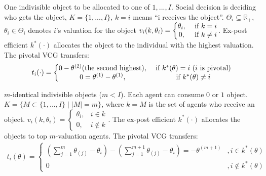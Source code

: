 \documentclass[11pt]{elegantbook_2}
\begin{document}
\begin{example}
    One indivisible object to be allocated to one of $1,...,I$. Social decision is deciding who gets the object, $K=\{1,...,I\}$, $k=i$ means ``i receives the object''. $\Theta_i\subseteq \mathbb{R}_+$, $\theta_i\in\Theta_i$ denotes $i$'s valuation for the object $v_i(k,\theta_i)=\left\{\begin{matrix}
        \theta_i,& \textnormal{ if }k=i\\
        0,& \textnormal{ if }k\neq i
    \end{matrix}\right.$.
    Ex-post efficient $k^*(\cdot)$ allocates the object to the individual with the highest valuation. The pivotal VCG transfers:
    \begin{equation}
        \begin{aligned}
            t_i(\cdot)=\left\{\begin{matrix}
                0-\theta^{(2)}\textnormal{(the second highest)},& \textnormal{ if }k^*(\theta)=i \textnormal{ ($i$ is pivotal)}\\
                0=\theta^{(1)}-\theta^{(1)},&\textnormal{ if }k^*(\theta)\neq i
            \end{matrix}\right.
        \end{aligned}
        \nonumber
    \end{equation}
\end{example}


\begin{example}
    $m$-identical indivisible objects ($m<I$). Each agent can consume $0$ or $1$ object. $K=\{M\subset \{1,...,I\}\mid |M|=m\}$, where $k=M$ is the set of agents who receive an object. $v_i(k,\theta_i)=\left\{\begin{matrix}
        \theta_i,&i\in k\\
        0,&i\notin k
    \end{matrix}\right.$. The ex-post efficient $k^*(\cdot)$ allocates the objects to top $m$-valuation agents. The pivotal VCG transfers:
    \begin{equation}
        \begin{aligned}
            t_i(\theta)=\left\{\begin{matrix}
                \left(\sum_{j=1}^m\theta_{(j)}-\theta_i\right)-\left(\sum_{j=1}^{m+1}\theta_{(j)}-\theta_i\right)=-\theta^{(m+1)}&,i\in k^*(\theta)\\
                0&,i\notin k^*(\theta)
            \end{matrix}\right.
        \end{aligned}
        \nonumber
    \end{equation}
\end{example}
\end{document}
